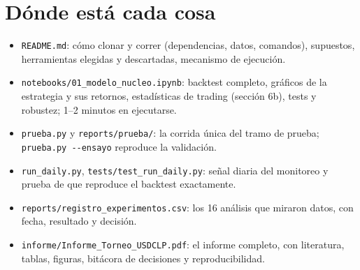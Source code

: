 \documentclass[11pt,a4paper]{article}
\begin{document}
\section{Dónde está cada cosa}

\begin{itemize}
\item \texttt{README.md}: cómo clonar y correr (dependencias, datos, comandos), supuestos, herramientas elegidas y descartadas, mecanismo de ejecución.
\item \texttt{notebooks/01\_modelo\_nucleo.ipynb}: backtest completo, gráficos de la estrategia y sus retornos, estadísticas de trading (sección 6b), tests y robustez; 1--2 minutos en ejecutarse.
\item \texttt{prueba.py} y \texttt{reports/prueba/}: la corrida única del tramo de prueba; \texttt{prueba.py -{}-ensayo} reproduce la validación.
\item \texttt{run\_daily.py}, \texttt{tests/test\_run\_daily.py}: señal diaria del monitoreo y prueba de que reproduce el backtest exactamente.
\item \texttt{reports/registro\_experimentos.csv}: los 16 análisis que miraron datos, con fecha, resultado y decisión.
\item \texttt{informe/Informe\_Torneo\_USDCLP.pdf}: el informe completo, con literatura, tablas, figuras, bitácora de decisiones y reproducibilidad.
\end{itemize}
\end{document}
